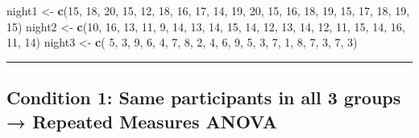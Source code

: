 \documentclass[
]{article}
\newenvironment{Shaded}{\begin{snugshade}}{\end{snugshade}}
\newcommand{\DecValTok}[1]{\textcolor[rgb]{0.00,0.00,0.81}{#1}}
\newcommand{\FunctionTok}[1]{\textcolor[rgb]{0.13,0.29,0.53}{\textbf{#1}}}
\newcommand{\NormalTok}[1]{#1}
\newcommand{\OtherTok}[1]{\textcolor[rgb]{0.56,0.35,0.01}{#1}}
\begin{document}
\begin{Shaded}
\begin{Highlighting}[]
\NormalTok{night1 }\OtherTok{\textless{}{-}} \FunctionTok{c}\NormalTok{(}\DecValTok{15}\NormalTok{, }\DecValTok{18}\NormalTok{, }\DecValTok{20}\NormalTok{, }\DecValTok{15}\NormalTok{, }\DecValTok{12}\NormalTok{, }\DecValTok{18}\NormalTok{, }\DecValTok{16}\NormalTok{, }\DecValTok{17}\NormalTok{, }\DecValTok{14}\NormalTok{, }\DecValTok{19}\NormalTok{, }\DecValTok{20}\NormalTok{, }\DecValTok{15}\NormalTok{, }\DecValTok{16}\NormalTok{, }\DecValTok{18}\NormalTok{, }\DecValTok{19}\NormalTok{, }\DecValTok{15}\NormalTok{, }\DecValTok{17}\NormalTok{, }\DecValTok{18}\NormalTok{, }\DecValTok{19}\NormalTok{, }\DecValTok{15}\NormalTok{)}
\NormalTok{night2 }\OtherTok{\textless{}{-}} \FunctionTok{c}\NormalTok{(}\DecValTok{10}\NormalTok{, }\DecValTok{16}\NormalTok{, }\DecValTok{13}\NormalTok{, }\DecValTok{11}\NormalTok{,  }\DecValTok{9}\NormalTok{, }\DecValTok{14}\NormalTok{, }\DecValTok{13}\NormalTok{, }\DecValTok{14}\NormalTok{, }\DecValTok{15}\NormalTok{, }\DecValTok{14}\NormalTok{, }\DecValTok{12}\NormalTok{, }\DecValTok{13}\NormalTok{, }\DecValTok{14}\NormalTok{, }\DecValTok{12}\NormalTok{, }\DecValTok{11}\NormalTok{, }\DecValTok{15}\NormalTok{, }\DecValTok{14}\NormalTok{, }\DecValTok{16}\NormalTok{, }\DecValTok{11}\NormalTok{, }\DecValTok{14}\NormalTok{)}
\NormalTok{night3 }\OtherTok{\textless{}{-}} \FunctionTok{c}\NormalTok{( }\DecValTok{5}\NormalTok{,  }\DecValTok{3}\NormalTok{,  }\DecValTok{9}\NormalTok{,  }\DecValTok{6}\NormalTok{,  }\DecValTok{4}\NormalTok{,  }\DecValTok{7}\NormalTok{,  }\DecValTok{8}\NormalTok{,  }\DecValTok{2}\NormalTok{,  }\DecValTok{4}\NormalTok{,  }\DecValTok{6}\NormalTok{,  }\DecValTok{9}\NormalTok{,  }\DecValTok{5}\NormalTok{,  }\DecValTok{3}\NormalTok{,  }\DecValTok{7}\NormalTok{,  }\DecValTok{1}\NormalTok{,  }\DecValTok{8}\NormalTok{,  }\DecValTok{7}\NormalTok{,  }\DecValTok{3}\NormalTok{,  }\DecValTok{7}\NormalTok{,  }\DecValTok{3}\NormalTok{)}
\end{Highlighting}
\end{Shaded}

\begin{center}\rule{0.5\linewidth}{0.5pt}\end{center}

\subsection{Condition 1: Same participants in all 3 groups → Repeated
Measures
ANOVA}\label{condition-1-same-participants-in-all-3-groups-repeated-measures-anova}
\end{document}
